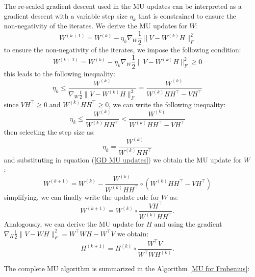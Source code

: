 The re-scaled gradient descent used in the MU updates can be interpreted as a gradient descent with a variable step size $\eta_k$ that is constrained to ensure the non-negativity of the iterates.
We derive the MU updates for $W$:
\begin{equation} \label{GD MU updates}
    W^{(k+1)} = W^{(k)} - \eta_k \nabla_W \frac{1}{2} \|V - W^{(k)}H\|_F^2
\end{equation}
to ensure the non-negativity of the iterates, we impose the following condition:
\begin{equation}
    W^{(k+1)} = W^{(k)} - \eta_k \nabla_W \frac{1}{2} \|V - W^{(k)}H\|_F^2 \geq 0
\end{equation}
this leads to the following inequality:
\begin{equation}
    \eta_k \leq \frac{W^{(k)}}{\nabla_W \frac{1}{2} \|V - W^{(k)}H\|_F^2} = \frac{W^{(k)}}{W^{(k)} H H^\top - V H^\top}
\end{equation}
since $VH^\top \geq 0$ and $W^{(k)} H H^\top \geq 0$, we can write the following inequality:
\begin{equation}
    \eta_k \leq \frac{W^{(k)}}{W^{(k)} H H^\top} < \frac{W^{(k)}}{W^{(k)} H H^\top - V H^\top}
\end{equation}
then selecting the step size as:
\begin{equation}
    \eta_k = \frac{W^{(k)}}{W^{(k)} H H^\top}
\end{equation}
and substituting in equation (\ref{GD MU updates}) we obtain the MU update for \( W \):
\begin{equation}
    W^{(k+1)} = W^{(k)} - \frac{W^{(k)}}{W^{(k)} H H^\top} \circ (W^{(k)} H H^\top - V H^\top)
\end{equation}
simplifying, we can finally write the update rule for \( W \) as:
\begin{equation}
    \boxed{W^{(k+1)} = W^{(k)} \circ \frac{V H^\top}{W^{(k)} H H^\top}.}
\end{equation}
Analogously, we can derive the MU update for \( H \) and using the gradient $\nabla_H \frac{1}{2} \|V - WH\|_F^2 = W^\top WH - W^\top V$ we obtain:
\begin{equation}
    \boxed{H^{(k+1)} = H^{(k)} \circ \frac{W^\top V}{W^\top W H^{(k)}}.}
\end{equation}
\par The complete MU algorithm is summarized in the Algorithm \ref{MU for Frobenius}:
